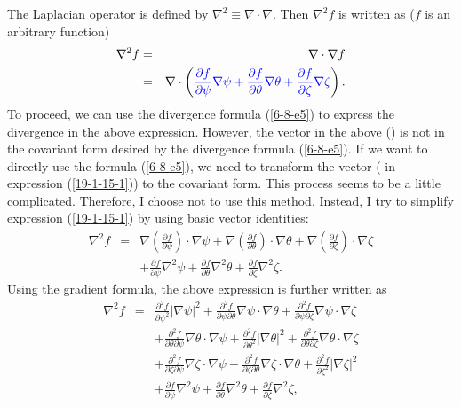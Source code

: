 \documentclass{llncs}
\newcommand{\tmcolor}[2]{{\color{#1}{#2}}}
\begin{document}
The Laplacian operator is defined by $\nabla^2 \equiv \nabla \cdot \nabla$.
Then $\nabla^2 f$ is written as ($f$ is an arbitrary function)
\begin{eqnarray}
  \nabla^2 f & = & \nabla \cdot \nabla f \nonumber\\
  & = & \nabla \cdot \left( \tmcolor{blue}{\frac{\partial f}{\partial \psi}
  \nabla \psi + \frac{\partial f}{\partial \theta} \nabla \theta +
  \frac{\partial f}{\partial \zeta} \nabla \zeta} \right) .  \label{19-1-15-1}
\end{eqnarray}
To proceed, we can use the divergence formula (\ref{6-8-e5}) to express the
divergence in the above expression. However, the vector in the above
(\tmcolor{blue}{blue term}) is not in the covariant form desired by the
divergence formula (\ref{6-8-e5}). If we want to directly use the formula
(\ref{6-8-e5}), we need to transform the vector (\tmcolor{blue}{blue term} in
expression (\ref{19-1-15-1})) to the covariant form. This process seems to be
a little complicated. Therefore, I choose not to use this method. Instead, I
try to simplify expression (\ref{19-1-15-1}) by using basic vector identities:
\begin{eqnarray}
  \nabla^2 f & = & \nabla \left( \frac{\partial f}{\partial \psi} \right)
  \cdot \nabla \psi + \nabla \left( \frac{\partial f}{\partial \theta} \right)
  \cdot \nabla \theta + \nabla \left( \frac{\partial f}{\partial \zeta}
  \right) \cdot \nabla \zeta \nonumber\\
  &  & + \frac{\partial f}{\partial \psi} \nabla^2 \psi + \frac{\partial
  f}{\partial \theta} \nabla^2 \theta + \frac{\partial f}{\partial \zeta}
  \nabla^2 \zeta . 
\end{eqnarray}
Using the gradient formula, the above expression is further written as
\begin{eqnarray}
  \nabla^2 f & = & \frac{\partial^2 f}{\partial \psi^2} | \nabla \psi |^2 +
  \frac{\partial^2 f}{\partial \psi \partial \theta} \nabla \psi \cdot \nabla
  \theta + \frac{\partial^2 f}{\partial \psi \partial \zeta} \nabla \psi \cdot
  \nabla \zeta \nonumber\\
  &  & + \frac{\partial^2 f}{\partial \theta \partial \psi} \nabla \theta
  \cdot \nabla \psi + \frac{\partial^2 f}{\partial \theta^2} | \nabla \theta
  |^2 + \frac{\partial^2 f}{\partial \theta \partial \zeta} \nabla \theta
  \cdot \nabla \zeta \nonumber\\
  &  & + \frac{\partial^2 f}{\partial \zeta \partial \psi} \nabla \zeta \cdot
  \nabla \psi + \frac{\partial^2 f}{\partial \zeta \partial \theta} \nabla
  \zeta \cdot \nabla \theta + \frac{\partial^2 f}{\partial \zeta^2} | \nabla
  \zeta |^2 \nonumber\\
  &  & + \frac{\partial f}{\partial \psi} \nabla^2 \psi + \frac{\partial
  f}{\partial \theta} \nabla^2 \theta + \frac{\partial f}{\partial \zeta}
  \nabla^2 \zeta, 
\end{eqnarray}
\end{document}
